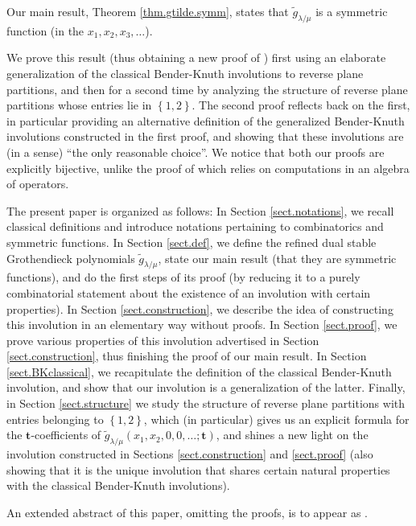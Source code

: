 \documentclass[numbers=enddot,12pt,final,onecolumn,notitlepage]{scrartcl}%
\theoremstyle{definition}
\def\g{{\widetilde{g}}}
\def\t{{\mathbf{t}}}
\def\lm{{\lambda/\mu}}
\begin{document}
Our main result, Theorem \ref{thm.gtilde.symm}, states that
$\widetilde{g}_{\lambda/\mu}$ is a symmetric function (in the $x_{1}%
,x_{2},x_{3},\ldots$).

We prove this result (thus obtaining a new proof of
\cite[Theorem 9.1]{LamPyl}) first using an elaborate generalization
of the classical Bender-Knuth involutions to reverse plane partitions,
and then for a second time by analyzing the structure of reverse plane
partitions whose entries lie in $\left\{1, 2\right\}$. The second
proof reflects back on the first, in particular providing an
alternative definition of the generalized Bender-Knuth involutions
constructed in the first proof, and showing that these involutions
are (in a sense) ``the only reasonable choice''.
We notice that both our proofs are explicitly bijective, unlike
the proof of \cite[Theorem 9.1]{LamPyl} which relies on computations
in an algebra of operators.

The present paper is organized as follows: In Section \ref{sect.notations}, we
recall classical definitions and introduce notations pertaining to
combinatorics and symmetric functions. In Section \ref{sect.def}, we define
the refined dual stable Grothendieck polynomials $\widetilde{g}_{\lambda/\mu}$, state
our main result (that they are symmetric functions), and do the first steps of
its proof (by reducing it to a purely combinatorial statement about the
existence of an involution with certain properties). In Section \ref{sect.construction}, we describe the idea of constructing this involution in an elementary way without proofs. In Section
\ref{sect.proof}, we prove various properties of this involution advertised in Section \ref{sect.construction}, thus finishing the proof of our main result. In Section \ref{sect.BKclassical}, we
recapitulate the definition of the classical Bender-Knuth involution, and
show that our involution is a generalization of the latter.
Finally, in Section \ref{sect.structure} we study the structure of
reverse plane partitions with entries belonging to $\left\{1, 2\right\}$,
which (in particular) gives us an explicit formula for the
$\mathbf{t}$-coefficients of $\g_\lm(x_1,x_2,0,0,\dots;\t)$, and shines
a new light on the involution constructed in Sections \ref{sect.construction}
and \ref{sect.proof}
(also showing that it is the unique involution that shares certain natural
properties with the classical Bender-Knuth involutions).

An extended abstract of this paper, omitting the proofs, is to appear
as \cite{GaGrLi16}.
\end{document}
